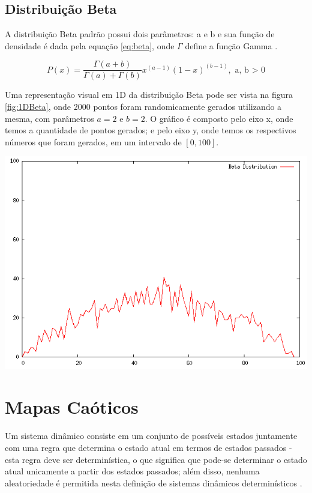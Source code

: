 \subsection{Distribuição Beta}

A distribuição Beta padrão possui dois parâmetros: a e b e sua função de densidade é dada pela equação \ref{eq:beta}, onde $\Gamma$ define a função Gamma \cite{ali}.

\begin{equation}
\label{eq:beta}
P(x) = \frac{\Gamma(a+b)}{\Gamma(a) + \Gamma(b)}x^{(a-1)}(1-x)^{(b-1)}, \text{ a, b > 0}
\end{equation}

Uma representação visual em 1D da distribuição Beta pode ser vista na figura \ref{fig:1DBeta}, onde 2000 pontos foram randomicamente gerados utilizando a mesma, com parâmetros $a = 2$ e $b = 2$. O gráfico é composto pelo eixo x, onde temos a quantidade de pontos gerados; e pelo eixo y, onde temos os respectivos números que foram gerados, em um intervalo de $[0, 100]$.

{
    \centering
    \includegraphics[width=0.6\linewidth]{figuras/DistribuicaoBeta.png}
    \label{fig:1DBeta}
}

\section{Mapas Caóticos}

Um sistema dinâmico consiste em um conjunto de possíveis estados juntamente com uma regra que determina o estado atual em termos de estados passados - esta regra deve ser determinística, o que significa que pode-se determinar o estado atual unicamente a partir dos estados passados; além disso, nenhuma aleatoriedade é permitida nesta definição de sistemas dinâmicos determinísticos \cite{alligood}.


